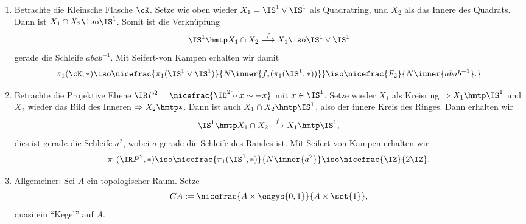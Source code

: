 \documentclass[language=ngerman]{TemplateLecture} %
\begin{document}
\begin{example}
\begin{enumerate}[$(i)$]
        \item Betrachte die Kleinsche Flasche $\cK$. Setze wie oben wieder $X_1 = \IS^1 \vee \IS^1$ als Quadratring, und $X_2$ als das Innere des Quadrats. Dann ist $X_1 \cap X_2 \iso \IS^1$. Somit ist die Verknüpfung
        \begin{equation*}
            \IS^1 \hmtp X_1 \cap X_2 \overset{f}{\longrightarrow} X_1 \iso \IS^1 \vee \IS^1
        \end{equation*}
        gerade die Schleife $a b a b^{-1}$. Mit Seifert-von Kampen erhalten wir damit 
        \begin{equation*}
            \pi_1(\cK, *) \iso \nicefrac{\pi_1(\IS^1 \vee \IS^1)}{N\inner{f_*(\pi_1(\IS^1, *))}} \iso \nicefrac{F_2}{N\inner{abab^{-1}}.}
        \end{equation*}
        \item Betrachte die Projektive Ebene $\IR P^2 = \nicefrac{\ID^2}{x \sim -x}$ mit $x \in \IS^1$. Setze wieder $X_1$ als Kreisring $\Rightarrow X_1 \hmtp \IS^1$ und $X_2$ wieder das Bild des Inneren $\Rightarrow X_2 \hmtp *$. Dann ist auch $X_1 \cap X_2 \hmtp \IS^1$, also der innere Kreis des Ringes. Dann erhalten wir 
        \begin{equation*}
            \IS^1 \hmtp X_1 \cap X_2 \overset{f}{\longrightarrow} X_1 \hmtp \IS^1,
        \end{equation*}
        dies ist gerade die Schleife $a^2$, wobei $a$ gerade die Schleife des Randes ist. Mit Seifert-von Kampen erhalten wir 
        \begin{equation*}
            \pi_1(\IR P^2, *) \iso \nicefrac{\pi_1(\IS^1, *)}{N\inner{a^2}} \iso \nicefrac{\IZ}{2\IZ}.
        \end{equation*}

        \item Allgemeiner: Sei $A$ ein topologischer Raum. Setze 
        \begin{equation*}
            CA := \nicefrac{A \times \edgys{0,1}}{A \times \set{1}},
        \end{equation*}
        quasi ein \enquote{Kegel} auf $A$.


\end{enumerate}
\end{example}
\end{document}
